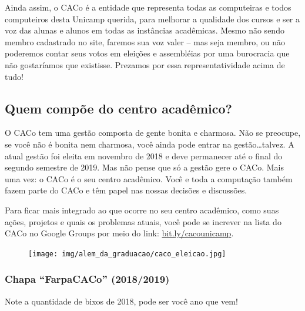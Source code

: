 Ainda assim, o CACo é a entidade que representa todas as computeiras e todos
computeiros desta Unicamp querida, para melhorar a qualidade dos cursos e ser a
voz das alunas e alunos em todas as instâncias acadêmicas. Mesmo não sendo
membro cadastrado no site, faremos sua voz valer -- mas seja membro, ou não
poderemos contar seus votos em eleições e assembléias por uma burocracia que
não gostaríamos que existisse. Prezamos por essa representatividade acima de
tudo!

\subsection{Quem compõe do centro acadêmico?}

O CACo tem uma gestão composta de gente bonita e charmosa. Não se preocupe, se
você não é bonita nem charmosa, você ainda pode entrar na gestão\dots talvez. A
atual gestão foi eleita em novembro de 2018 e deve permanecer até o final do
segundo semestre de 2019. Mas não pense que só a gestão gere o CACo. Mais uma
vez: o CACo é o seu centro acadêmico. Você e toda a computação também fazem
parte do CACo e têm papel nas nossas decisões e discussões.

Para ficar mais integrado ao que ocorre no seu centro acadêmico, como suas
ações, projetos e quais os problemas atuais, você pode se increver na lista do
CACo no Google Groups por meio do link:
\url{bit.ly/cacounicamp}.

\begin{figure}[H]
  \centering
  \texttt{[image: img/alem\_da\_graduacao/caco\_eleicao.jpg]}
\end{figure}

\subsubsection{Chapa ``FarpaCACo'' (2018/2019)}

Note a quantidade de bixos de 2018, pode ser você ano que vem!

